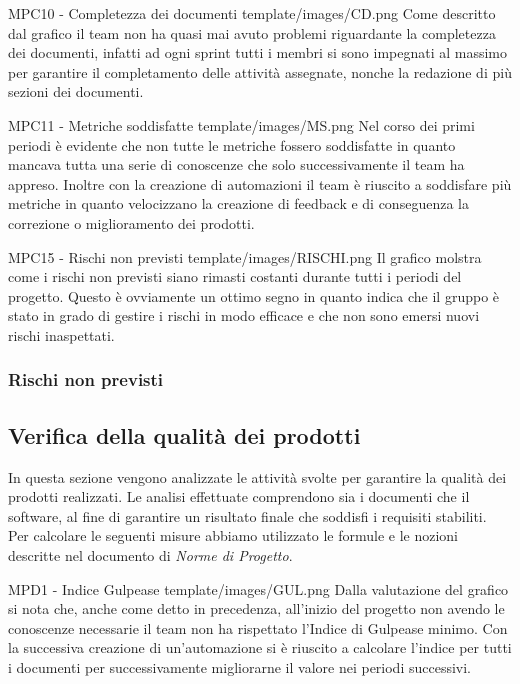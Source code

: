 \Met
{ %
    MPC10 - Completezza dei documenti
}
{ %
    template/images/CD.png
}
{ %
    Come descritto dal grafico il team non ha quasi mai avuto problemi riguardante la completezza dei documenti, infatti ad ogni sprint tutti i membri si sono impegnati
    al massimo per garantire il completamento delle attività assegnate, nonche la redazione di più sezioni dei documenti.
}

\Met
{ %
    MPC11 - Metriche soddisfatte
}
{ %
    template/images/MS.png
}
{ %
    Nel corso dei primi periodi è evidente che non tutte le metriche fossero soddisfatte in quanto mancava tutta una serie di conoscenze
    che solo successivamente il team ha appreso. Inoltre con la creazione di automazioni il team è riuscito a soddisfare più metriche in quanto 
    velocizzano la creazione di feedback e di conseguenza la correzione o miglioramento dei prodotti.
}

\Met
{ %
    MPC15 - Rischi non previsti
}
{ %
    template/images/RISCHI.png
}
{ %
    Il grafico molstra come i rischi non previsti siano rimasti costanti durante tutti i periodi del progetto.
    Questo è ovviamente un ottimo segno in quanto indica che il gruppo è stato in grado di gestire i rischi in modo efficace e che non sono 
    emersi nuovi rischi inaspettati.
}


\subsubsection{Rischi non previsti}

\subsection{Verifica della qualità dei prodotti}
In questa sezione vengono analizzate le attività svolte per garantire la qualità dei prodotti realizzati. Le analisi effettuate comprendono sia i documenti che il software, al fine di garantire un risultato finale che soddisfi i requisiti stabiliti.\\
Per calcolare le seguenti misure abbiamo utilizzato le formule e le nozioni descritte nel documento di \textit{Norme di Progetto}.

\Met
{ %
    MPD1 - Indice Gulpease
}
{ %
    template/images/GUL.png
}
{ %
    Dalla valutazione del grafico si nota che, anche come detto in precedenza, all'inizio del progetto non avendo le conoscenze necessarie
    il team non ha rispettato l'Indice di Gulpease minimo.
    Con la successiva creazione di un'automazione si è riuscito a calcolare l'indice per tutti i documenti per successivamente migliorarne il valore nei periodi successivi.
}

